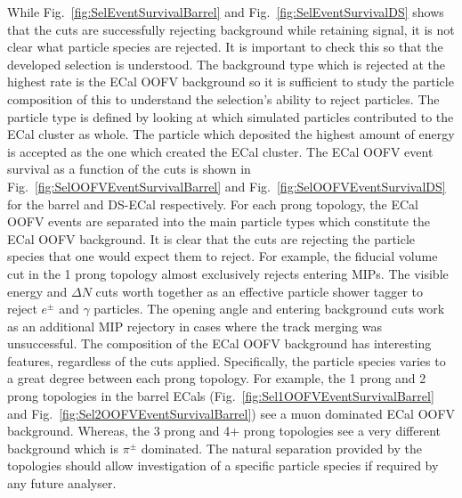 While Fig.~\ref{fig:SelEventSurvivalBarrel} and Fig.~\ref{fig:SelEventSurvivalDS} shows that the cuts are successfully rejecting background while retaining signal, it is not clear what particle species are rejected.  It is important to check this so that the developed selection is understood.  The background type which is rejected at the highest rate is the ECal OOFV background so it is sufficient to study the particle composition of this to understand the selection's ability to reject particles.  The particle type is defined by looking at which simulated particles contributed to the ECal cluster as whole.  The particle which deposited the highest amount of energy is accepted as the one which created the ECal cluster.  The ECal OOFV event survival as a function of the cuts is shown in Fig.~\ref{fig:SelOOFVEventSurvivalBarrel} and Fig.~\ref{fig:SelOOFVEventSurvivalDS} for the barrel and DS-ECal respectively.  For each prong topology, the ECal OOFV events are separated into the main particle types which constitute the ECal OOFV background.  It is clear that the cuts are rejecting the particle species that one would expect them to reject.  For example, the fiducial volume cut in the 1 prong topology almost exclusively rejects entering MIPs.  The visible energy and $\Delta N$ cuts worth together as an effective particle shower tagger to reject $e^\pm$ and $\gamma$ particles.  The opening angle and entering background cuts work as an additional MIP rejectory in cases where the track merging was unsuccessful.  The composition of the ECal OOFV background has interesting features, regardless of the cuts applied.  Specifically, the particle species varies to a great degree between each prong topology.  For example, the 1 prong and 2 prong topologies in the barrel ECals (Fig.~\ref{fig:Sel1OOFVEventSurvivalBarrel} and Fig.~\ref{fig:Sel2OOFVEventSurvivalBarrel}) see a muon dominated ECal OOFV background.  Whereas, the 3 prong and 4+ prong topologies see a very different background which is $\pi^\pm$ dominated.  The natural separation provided by the topologies should allow investigation of a specific particle species if required by any future analyser.
